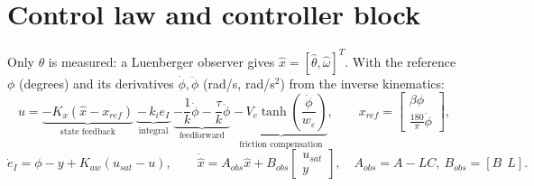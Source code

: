\documentclass[10pt,a4paper]{article}
\begin{document}
\section{Control law and controller block}\label{sec:ctrl}

Only $\theta$ is measured: a Luenberger observer gives $\hat x=[\hat\theta,\hat\omega]^T$. With the reference
$\phi$ (degrees) and its derivatives $\dot\phi,\ddot\phi$ (rad/s, rad/s$^2$) from the inverse kinematics:
\begin{equation}\label{eq:law}
  u = \underbrace{-K_x\left(\hat x - x_{ref}\right)}_{\text{state feedback}}
      \;\underbrace{-\,k_i e_I}_{\text{integral}}
      \;\underbrace{-\frac{1}{k}\dot\phi - \frac{\tau}{k}\ddot\phi}_{\text{feedforward}}
      \;\underbrace{-\,V_{c}\tanh\!\left(\frac{\dot\phi}{w_\varepsilon}\right)}_{\text{friction compensation}},
  \qquad x_{ref}=\begin{bmatrix}\beta\phi\\ \tfrac{180}{\pi}\dot\phi\end{bmatrix},
\end{equation}
\begin{equation}
  \dot e_I = \phi - y + K_{aw}(u_{sat}-u),\qquad
  \dot{\hat x} = A_{obs}\hat x + B_{obs}\begin{bmatrix}u_{sat}\\ y\end{bmatrix},\quad A_{obs}=A-LC,\ B_{obs}=[B\ \ L].
\end{equation}
\end{document}
